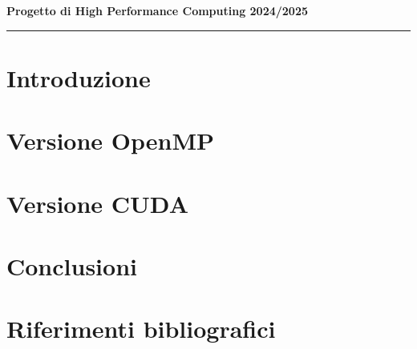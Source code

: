 \documentclass[12pt,a4paper]{report}
\begin{document}
\begin{center}
	\Large{\textbf{Progetto di High Performance Computing 2024/2025}}
	\rule[0cm]{15.8cm}{}
	{
	}
\end{center}

\samepage

\section{Introduzione}\label{sec:introduzione} %


\section{Versione OpenMP}\label{sec:versione_openmp} %

\section{Versione CUDA}\label{sec:versione_cuda} %

\section{Conclusioni}\label{sec:conclusioni} %

\section{Riferimenti bibliografici}\label{sec:riferimenti_bibliografici} %
\end{document}
